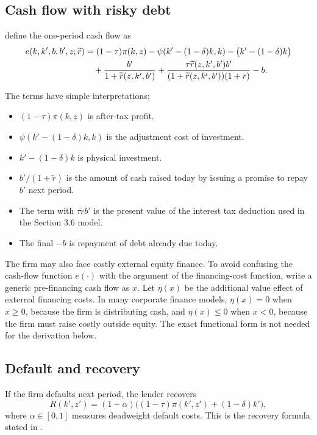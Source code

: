 \documentclass[11pt]{article}
\newcommand{\1}{\mathbf{1}}
\begin{document}
\subsection{Cash flow with risky debt}

\citet[eq. (3.26)]{strebulaev2012dynamic} define the one-period cash flow as
\begin{align}
  e(k,k',b,b',z;\widetilde r)
  &=
  (1-\tau)\pi(k,z)
  -\psi(k'-(1-\delta)k,k)
  -\bigl(k'-(1-\delta)k\bigr) \notag\\
  &\quad
  +\frac{b'}{1+\widetilde r(z,k',b')}
  +\frac{\tau \widetilde r(z,k',b')b'}
  {(1+\widetilde r(z,k',b'))(1+r)}
  -b .
  \label{eq:risky-cash-flow}
\end{align}

The terms have simple interpretations:
\begin{itemize}[leftmargin=2em]
  \item \((1-\tau)\pi(k,z)\) is after-tax profit.
  \item \(\psi(k'-(1-\delta)k,k)\) is the adjustment cost of investment.
  \item \(k'-(1-\delta)k\) is physical investment.
  \item \(b'/(1+\widetilde r)\) is the amount of cash raised today by issuing
  a promise to repay \(b'\) next period.
  \item The term with \(\tau \widetilde r b'\) is the present value of the
  interest tax deduction used in the Section 3.6 model.
  \item The final \(-b\) is repayment of debt already due today.
\end{itemize}

The firm may also face costly external equity finance. To avoid confusing the
cash-flow function \(e(\cdot)\) with the argument of the financing-cost function,
write a generic pre-financing cash flow as \(x\). Let \(\eta(x)\) be the
additional value effect of external financing costs. In many corporate finance
models, \(\eta(x)=0\) when \(x\ge 0\), because the firm is distributing cash, and
\(\eta(x)\le 0\) when \(x<0\), because the firm must raise costly outside equity.
The exact functional form is not needed for the derivation below.

\subsection{Default and recovery}

If the firm defaults next period, the lender recovers
\begin{equation}
  R(k',z')
  =
  (1-\alpha)\bigl((1-\tau)\pi(k',z')+(1-\delta)k'\bigr),
  \label{eq:recovery}
\end{equation}
where \(\alpha\in[0,1]\) measures deadweight default costs. This is the recovery
formula stated in \citet[Section 3.6]{strebulaev2012dynamic}.
\end{document}
